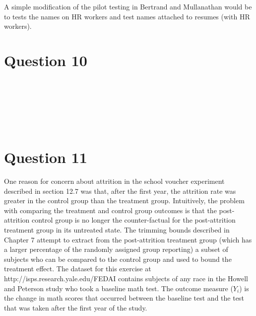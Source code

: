 \documentclass[11pt,notitlepage]{article}\usepackage[]{graphicx}\usepackage[]{color}
\makeatletter
\newenvironment{kframe}{%
 \def\at@end@of@kframe{}%
 \ifinner\ifhmode%
  \def\at@end@of@kframe{\end{minipage}}%
  \begin{minipage}{\columnwidth}%
 \fi\fi%
 \def\FrameCommand##1{\hskip\@totalleftmargin \hskip-\fboxsep
 \colorbox{shadecolor}{##1}\hskip-\fboxsep
     \hskip-\linewidth \hskip-\@totalleftmargin \hskip\columnwidth}%
 \MakeFramed {\advance\hsize-\width
   \@totalleftmargin\z@ \linewidth\hsize
   \@setminipage}}%
 {\par\unskip\endMakeFramed%
 \at@end@of@kframe}
\newenvironment{knitrout}{}{} %
\makeatother
\begin{document}
\begin{enumerate}[a)]
A simple modification of the pilot testing in Bertrand and Mullanathan would be to tests the names on HR workers and test names attached to resumes (with HR workers). 

\end{enumerate}


\section*{Question 10}
\begin{knitrout}
\color{fgcolor}\begin{kframe}
\begin{verbatim}






\end{verbatim}
\end{kframe}
\end{knitrout}


\section*{Question 11}
One reason for concern about attrition in the school voucher experiment described in section 12.7 was that, after the first year, the attrition rate was greater in the control group than the treatment group. Intuitively, the problem with comparing the treatment and control group outcomes is that the post-attrition control group is no longer the counter-factual for the post-attrition treatment group in its untreated state. The trimming bounds described in Chapter 7 attempt to extract from the post-attrition treatment group (which has a larger percentage of the randomly assigned group reporting) a subset of subjects who can be compared to the control group and used to bound the treatment effect. The dataset for this exercise at http://isps.research.yale.edu/FEDAI contains subjects of any race in the Howell and Peterson study who took a baseline math test. The outcome measure ($Y_i$) is the change in math scores that occurred between the baseline test and the test that was taken after the first year of the study.
\end{document}
